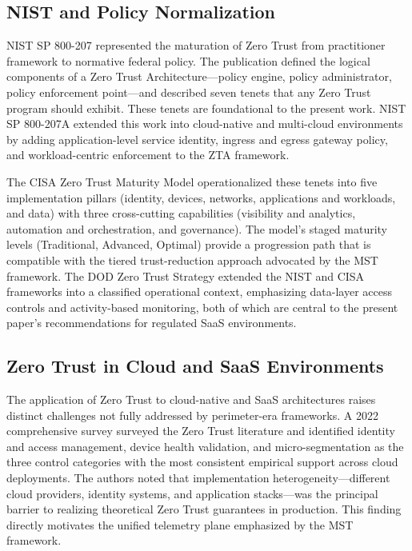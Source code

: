 \documentclass[unnumsec,webpdf,contemporary,large]{oup-authoring-template}
\theoremstyle{thmstyleone}
\theoremstyle{thmstyletwo}
\theoremstyle{thmstylethree}
\begin{document}
\subsection{NIST and Policy Normalization}

NIST SP 800-207 \cite{rose2020} represented the maturation of Zero Trust from
practitioner framework to normative federal policy. The publication defined the logical
components of a Zero Trust Architecture---policy engine, policy administrator, policy
enforcement point---and described seven tenets that any Zero Trust program should exhibit.
These tenets are foundational to the present work. NIST SP 800-207A \cite{chandramouli2023} extended this work into cloud-native and multi-cloud environments
by adding application-level service identity, ingress and egress gateway policy, and
workload-centric enforcement to the ZTA framework.

The CISA Zero Trust Maturity Model \cite{cisa2023} operationalized these tenets into five
implementation pillars (identity, devices, networks, applications and workloads, and data)
with three cross-cutting capabilities (visibility and analytics, automation and
orchestration, and governance). The model's staged maturity levels (Traditional, Advanced,
Optimal) provide a progression path that is compatible with the tiered trust-reduction
approach advocated by the MST framework. The DOD Zero Trust Strategy \cite{dod2022}
extended the NIST and CISA frameworks into a classified operational context, emphasizing
data-layer access controls and activity-based monitoring, both of which are central to
the present paper's recommendations for regulated SaaS environments.

\subsection{Zero Trust in Cloud and SaaS Environments}

The application of Zero Trust to cloud-native and SaaS architectures raises distinct
challenges not fully addressed by perimeter-era frameworks. A 2022 comprehensive survey \cite{syed2022}
surveyed the Zero Trust literature and identified identity and access management, device
health validation, and micro-segmentation as the three control categories with the most
consistent empirical support across cloud deployments. The authors noted that
implementation heterogeneity---different cloud providers, identity systems, and application
stacks---was the principal barrier to realizing theoretical Zero Trust guarantees in
production. This finding directly motivates the unified telemetry plane emphasized by the
MST framework.
\end{document}
